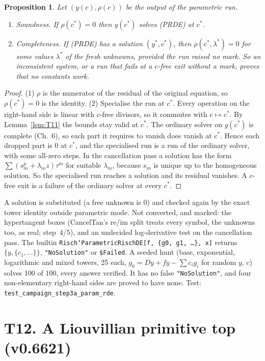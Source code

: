\documentclass[11pt]{article}
\newtheorem{proposition}[theorem]{Proposition}
\theoremstyle{definition}
\theoremstyle{remark}
\newcommand{\code}[1]{\texttt{#1}}
\begin{document}
\begin{proposition}\label{prop:T11}
Let $(y(c),\rho(c))$ be the output of the parametric run.
\begin{enumerate}
\item \emph{Soundness.} If $\rho(c^*)=0$ then $y(c^*)$ solves (PRDE) at $c^*$.
\item \emph{Completeness.} If (PRDE) has a solution $(y^*,c^*)$, then
  $\rho(c^*,\lambda^*)=0$ for some values $\lambda^*$ of the fresh unknowns, provided
  the run raised no mark. So an inconsistent system, or a run that fails at a
  $c$-free exit without a mark, proves that no constants work.
\end{enumerate}
\end{proposition}
\begin{proof}
(1) $\rho$ is the numerator of the residual of the original equation, so $\rho(c^*)=0$
is the identity. (2) Specialise the run at $c^*$. Every operation on the right-hand side
is linear with $c$-free divisors, so it commutes with $c\mapsto c^*$. By
Lemma~\ref{lem:T11} the bounds stay valid at $c^*$. The ordinary solver on $g(c^*)$ is
complete (Ch.~6), so each part it requires to vanish does vanish at $c^*$. Hence each
dropped part is $0$ at $c^*$, and the specialised run is a run of the ordinary solver,
with some all-zero steps. In the cancellation pass a solution has the form
$\sum(s_m^p+\lambda_mz)\tau^m$ for suitable $\lambda_m$, because $s_m$ is unique up to
the homogeneous solution. So the specialised run reaches a solution and its residual
vanishes. A $c$-free exit is a failure of the ordinary solver at every $c^*$.
\end{proof}

A solution is substituted (a free unknown is $0$) and checked again by the exact tower
identity outside parametric mode. Not converted, and marked: the hypertangent boxes
(CancelTan's re/im split treats every symbol, the unknowns too, as real; step~4/5), and
an undecided log-derivative test on the cancellation pass. The builtin
\code{Risch`ParametricRischDE[f, \{g0, g1, \dots\}, x]} returns
$\{y,\{c_1,\dots\}\}$, \code{"NoSolution"} or \code{\$Failed}. A seeded hunt (base,
exponential, logarithmic and mixed towers, 25 each, $g_0=Dy+fy-\sum c_ig_i$ for random
$y$, $c$) solves 100 of 100, every answer verified. It has no false
\code{"NoSolution"}, and four non-elementary right-hand sides are proved to have none.
Test: \code{test\_campaign\_step3a\_param\_rde}.

\section*{T12. A Liouvillian primitive top (v0.6621)}
\label{sec:T12}
\end{document}
